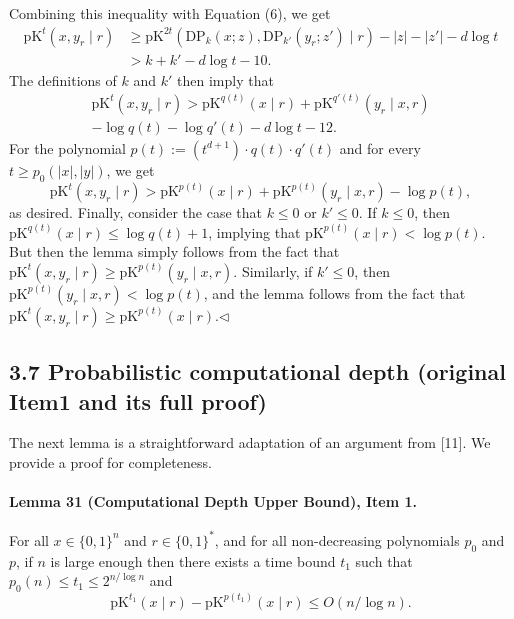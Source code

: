 Combining this inequality with Equation (6), we get
\begin{align*}
\mathrm{pK}^t(x,y_r\mid r)
&\geq\mathrm{pK}^{2t}(\mathrm{DP}_k(x;z),\mathrm{DP}_{k'}(y_r;z')\mid r)-|z|-|z'|-d\log t\\
&>k+k'-d\log t-10.\tag{12}
\end{align*}
The definitions of $k$ and $k'$ then imply that
\begin{multline*}
\mathrm{pK}^t(x,y_r\mid r)>\mathrm{pK}^{q(t)}(x\mid r)+\mathrm{pK}^{q'(t)}(y_r\mid x,r)\\
-\log q(t)-\log q'(t)-d\log t-12.
\end{multline*}
For the polynomial $p(t):=(t^{d+1})\cdot q(t)\cdot q'(t)$ and for every $t\geq p_0(|x|,|y|)$, we get
\[\mathrm{pK}^t(x,y_r\mid r)>\mathrm{pK}^{p(t)}(x\mid r)+\mathrm{pK}^{p(t)}(y_r\mid x,r)-\log p(t),\]
as desired.
Finally, consider the case that $k\leq0$ or $k'\leq0$. If $k\leq0$, then $\mathrm{pK}^{q(t)}(x\mid r)\leq\log q(t)+1$, implying that $\mathrm{pK}^{p(t)}(x\mid r)<\log p(t)$. But then the lemma simply follows from the fact that $\mathrm{pK}^t(x,y_r\mid r)\geq\mathrm{pK}^{p(t)}(y_r\mid x,r)$. Similarly, if $k'\leq0$, then $\mathrm{pK}^{p(t)}(y_r\mid x,r)<\log p(t)$, and the lemma follows from the fact that $\mathrm{pK}^t(x,y_r\mid r)\geq\mathrm{pK}^{p(t)}(x\mid r)$.\hfill$\triangleleft$
\subsection*{3.7 Probabilistic computational depth (original Item1 and its full proof)}
The next lemma is a straightforward adaptation of an argument from [11]. We provide a proof for completeness.
\paragraph{Lemma 31 (Computational Depth Upper Bound), Item 1.} For all $x\in\{0,1\}^n$ and $r\in\{0,1\}^*$, and for all non-decreasing polynomials $p_0$ and $p$, if $n$ is large enough then there exists a time bound $t_1$ such that $p_0(n)\leq t_1\leq2^{n/\log n}$ and
\[\mathrm{pK}^{t_1}(x\mid r)-\mathrm{pK}^{p(t_1)}(x\mid r)\leq O(n/\log n).\]
